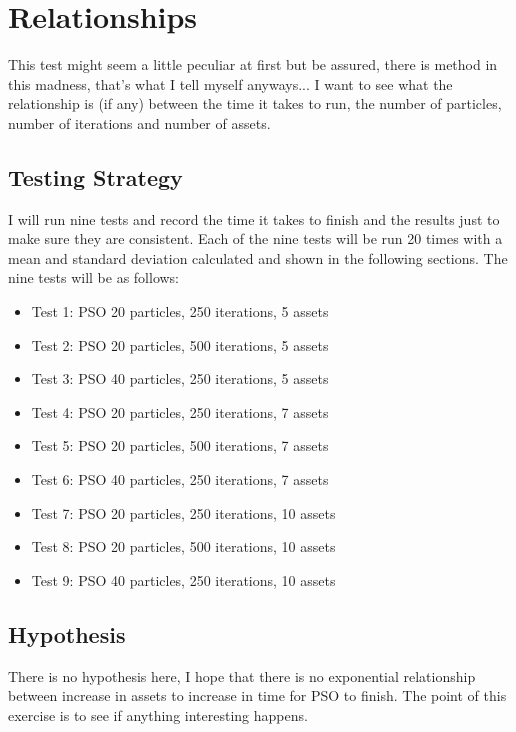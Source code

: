 \documentclass{pdfmx4020}
\begin{document}
  \section{Relationships} %
  \label{sec:relationships}
  This test might seem a little peculiar at first but be assured, there is method in this madness, that's what I tell myself anyways... I want to see what the relationship is (if any) between the time it takes to run, the number of particles, number of iterations and number of assets.

    \subsection{Testing Strategy} %
    \label{sub:testing_strategy}
      I will run nine tests and record the time it takes to finish and the results just to make sure they are consistent. Each of the nine tests will be run 20 times with a mean and standard deviation calculated and shown in the following sections. The nine tests will be as follows:
        \begin{itemize}
          \item Test 1: PSO 20 particles, 250 iterations, 5 assets
          \item Test 2: PSO 20 particles, 500 iterations, 5 assets
          \item Test 3: PSO 40 particles, 250 iterations, 5 assets
          \item Test 4: PSO 20 particles, 250 iterations, 7 assets
          \item Test 5: PSO 20 particles, 500 iterations, 7 assets
          \item Test 6: PSO 40 particles, 250 iterations, 7 assets
          \item Test 7: PSO 20 particles, 250 iterations, 10 assets
          \item Test 8: PSO 20 particles, 500 iterations, 10 assets
          \item Test 9: PSO 40 particles, 250 iterations, 10 assets
        \end{itemize}

    \subsection{Hypothesis} %
    \label{sub:hypothesis}
    There is no hypothesis here, I hope that there is no exponential relationship between increase in assets to increase in time for PSO to finish. The point of this exercise is to see if anything interesting happens. 
\end{document}
